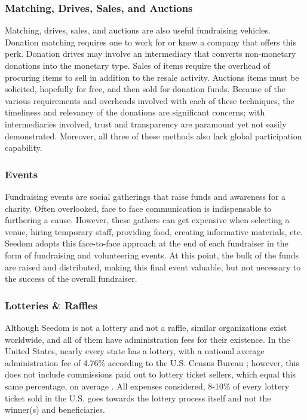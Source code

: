 \documentclass[11pt]{article}
\begin{document}
\subsubsection{Matching, Drives, Sales, and Auctions}

Matching, drives, sales, and auctions are also useful fundraising vehicles. Donation matching requires one to work for or know a company that offers this perk. Donation drives may involve an intermediary that converts non-monetary donations into the monetary type. Sales of items require the overhead of procuring items to sell in addition to the resale activity. Auctions items must be solicited, hopefully for free, and then sold for donation funds. Because of the various requirements and overheads involved with each of these techniques, the timeliness and relevancy of the donations are significant concerns; with intermediaries involved, trust and transparency are paramount yet not easily demonstrated. Moreover, all three of these methods also lack global participation capability.

\subsubsection{Events}

Fundraising events are social gatherings that raise funds and awareness for a charity. Often overlooked, face to face communication is indispensable to furthering a cause. However, these gathers can get expensive when selecting a venue, hiring temporary staff, providing food, creating informative materials, etc. Seedom adopts this face-to-face approach at the end of each fundraiser in the form of fundraising and volunteering events. At this point, the bulk of the funds are raised and distributed, making this final event valuable, but not necessary to the success of the overall fundraiser.

\subsubsection{Lotteries \& Raffles}

Although Seedom is not a lottery and not a raffle, similar organizations exist worldwide, and all of them have administration fees for their existence. In the United States, nearly every state has a lottery, with a national average administration fee of 4.76\% according to the U.S. Census Bureau \cite{3}; however, this does not include commissions paid out to lottery ticket sellers, which equal this same percentage, on average \cite{4}. All expenses considered, 8-10\% of every lottery ticket sold in the U.S. goes towards the lottery process itself and not the winner(s) and beneficiaries.
\end{document}
